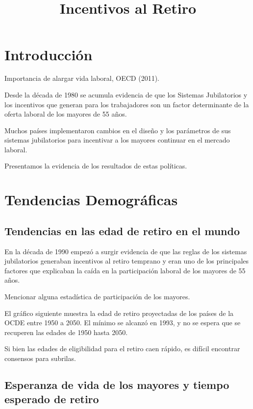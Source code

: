 \documentclass[]{article}
\title{Incentivos al Retiro}
\author{}
\date{}
\begin{document}
\maketitle

{
\setcounter{tocdepth}{3}
\tableofcontents
}
\section{Introducción}\label{introduccion}

Importancia de alargar vida laboral, OECD (2011).

Desde la década de 1980 se acumula evidencia de que los Sistemas
Jubilatorios y los incentivos que generan para los trabajadores son un
factor determinante de la oferta laboral de los mayores de 55 años.

Muchos países implementaron cambios en el diseño y los parámetros de sus
sistemas jubilatorios para incentivar a los mayores continuar en el
mercado laboral.

Presentamos la evidencia de los resultados de estas políticas.

\section{Tendencias Demográficas}\label{tendencias-demograficas}

\subsection{Tendencias en las edad de retiro en el
mundo}\label{tendencias-en-las-edad-de-retiro-en-el-mundo}

En la década de 1990 empezó a surgir evidencia de que las reglas de los
sistemas jubilatorios generaban incentivos al retiro temprano y eran uno
de los principales factores que explicaban la caída en la participación
laboral de los mayores de 55 años.

Mencionar alguna estadística de participación de los mayores.

El gráfico siguiente muestra la edad de retiro proyectadas de los países
de la OCDE entre 1950 a 2050. El mínimo se alcanzó en 1993, y no se
espera que se recuperen las edades de 1950 hasta 2050.

Si bien las edades de eligibilidad para el retiro caen rápido, es
difícil encontrar consensos para subrilas.

\subsection{Esperanza de vida de los mayores y tiempo esperado de
retiro}\label{esperanza-de-vida-de-los-mayores-y-tiempo-esperado-de-retiro}
\end{document}
